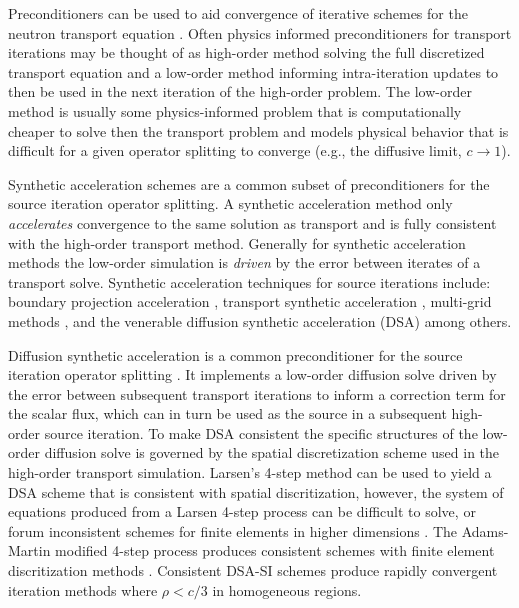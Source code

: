 Preconditioners can be used to aid convergence of iterative schemes for the neutron transport equation \cite{adams_fast_2002}.
Often physics informed preconditioners for transport iterations may be thought of as high-order method solving the full discretized transport equation and a low-order method informing intra-iteration updates to then be used in the next iteration of the high-order problem.
The low-order method is usually some physics-informed problem that is computationally cheaper to solve then the transport problem and models physical behavior that is difficult for a given operator splitting to converge (e.g., the diffusive limit, $c\rightarrow1$).

Synthetic acceleration schemes are a common subset of preconditioners for the source iteration operator splitting.
A synthetic acceleration method only \textit{accelerates} convergence to the same solution as transport and is fully consistent with the high-order transport method.
Generally for synthetic acceleration methods the low-order simulation is \textit{driven} by the error between iterates of a transport solve.
Synthetic acceleration techniques for source iterations include:
boundary projection acceleration \cite{adams_boundary_1988}, 
transport synthetic acceleration \cite{ramone_1997_tsa},
multi-grid methods \cite{man1994parallel},
and the venerable diffusion synthetic acceleration (DSA) \cite{larsen_1983_dsaforsn} among others.

Diffusion synthetic acceleration is a common preconditioner for the source iteration operator splitting \cite{adams_fast_2002, alcouffe_1977_dd, coale_2025_dsa}.
It implements a low-order diffusion solve driven by the error between subsequent transport iterations to inform a correction term for the scalar flux, which can in turn be used as the source in a subsequent high-order source iteration.
To make DSA consistent the specific structures of the low-order diffusion solve is governed by the spatial discretization scheme used in the high-order transport simulation.
Larsen's 4-step method can be used to yield a DSA scheme that is consistent with spatial discritization, however, the system of equations produced from a Larsen 4-step process can be difficult to solve, or forum inconsistent schemes for finite elements in higher dimensions \cite{larsen_1982_unconDSA, larsen_1982_unconDSAte, haut_2020_dsa}. 
The Adams-Martin modified 4-step process produces consistent schemes with finite element discritization methods \cite{adams_1992_dsadfe}.
Consistent DSA-SI schemes produce rapidly convergent iteration methods where $\rho<c/3$ in homogeneous regions.

